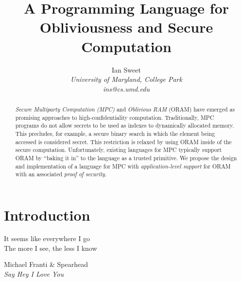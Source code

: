 \documentclass{report}
\begin{document}
\title{A Programming Language for Obliviousness and Secure Computation}

\author{Ian Sweet \\
  \emph{University of Maryland, College Park} \\
  \emph{ins@cs.umd.edu}}

\date{}

\maketitle

\begin{abstract}
  \emph{Secure Multiparty Computation (MPC)} and \emph{Oblivious RAM} (ORAM) have emerged as promising approaches to
  high-confidentiality computation. Traditionally, MPC programs do not allow secrets to be used as indexes to dynamically
  allocated memory. This precludes, for example, a secure binary search in which the element being accessed is considered secret.
  This restriction is relaxed by using ORAM inside of the secure computation. Unfortunately, existing languages for MPC typically
  support ORAM by ``baking it in'' to the language as a trusted primitive. We propose the design and implementation of a language
  for MPC with \emph{application-level support} for ORAM with an associated \emph{proof of security}.
\end{abstract}

\chapter{Introduction}

\epigraph{It seems like everywhere I go \\
          The more I see, the less I know}{
            Michael Franti \& Spearhead \\
            \emph{Say Hey I Love You}}
\end{document}
